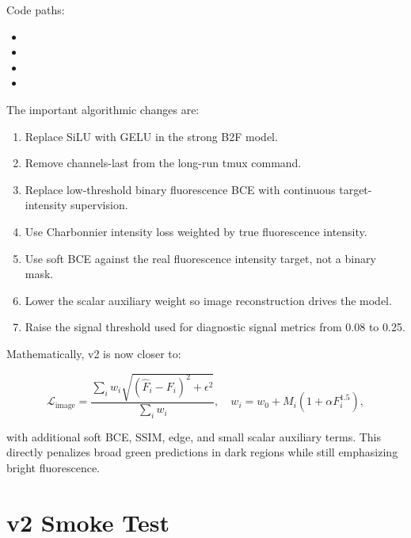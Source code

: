 \documentclass[11pt]{article}
\begin{document}
Code paths:

\begin{itemize}
\item {}
\item {}
\item {}
\item {}
\end{itemize}

The important algorithmic changes are:

\begin{enumerate}
\item Replace SiLU with GELU in the strong B2F model.
\item Remove channels-last from the long-run tmux command.
\item Replace low-threshold binary fluorescence BCE with continuous target-intensity supervision.
\item Use Charbonnier intensity loss weighted by true fluorescence intensity.
\item Use soft BCE against the real fluorescence intensity target, not a binary mask.
\item Lower the scalar auxiliary weight so image reconstruction drives the model.
\item Raise the signal threshold used for diagnostic signal metrics from 0.08 to 0.25.
\end{enumerate}

Mathematically, v2 is now closer to:

\begin{equation}
\mathcal{L}_{\mathrm{image}}
=
\frac{\sum_i w_i \sqrt{(\hat{F}_i-F_i)^2+\epsilon^2}}{\sum_i w_i},
\quad
w_i = w_0 + M_i(1+\alpha F_i^{1.5}),
\end{equation}

with additional soft BCE, SSIM, edge, and small scalar auxiliary terms. This directly penalizes broad green predictions in dark regions while still emphasizing bright fluorescence.

\section{v2 Smoke Test}
\end{document}
